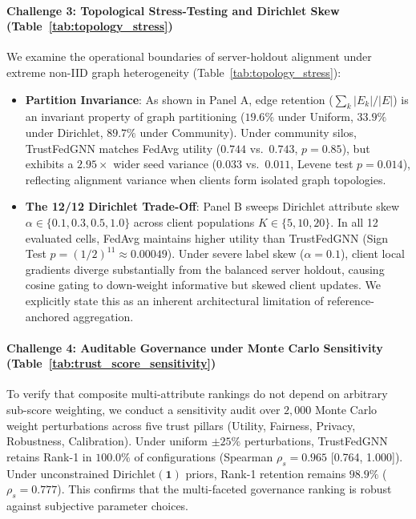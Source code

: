 \paragraph{Challenge 3: Topological Stress-Testing and Dirichlet Skew (Table~\ref{tab:topology_stress})}
We examine the operational boundaries of server-holdout alignment under extreme non-IID graph heterogeneity (Table~\ref{tab:topology_stress}):
\begin{itemize}[leftmargin=*]
    \item \textbf{Partition Invariance}: As shown in Panel A, edge retention ($\sum_k |E_k| / |E|$) is an invariant property of graph partitioning ($19.6\%$ under Uniform, $33.9\%$ under Dirichlet, $89.7\%$ under Community). Under community silos, TrustFedGNN matches FedAvg utility ($0.744$ vs.\ $0.743$, $p=0.85$), but exhibits a $2.95\times$ wider seed variance ($0.033$ vs.\ $0.011$, Levene test $p = 0.014$), reflecting alignment variance when clients form isolated graph topologies.
    \item \textbf{The 12/12 Dirichlet Trade-Off}: Panel B sweeps Dirichlet attribute skew $\alpha \in \{0.1, 0.3, 0.5, 1.0\}$ across client populations $K \in \{5, 10, 20\}$. In all 12 evaluated cells, FedAvg maintains higher utility than TrustFedGNN (Sign Test $p = (1/2)^{11} \approx 0.00049$). Under severe label skew ($\alpha = 0.1$), client local gradients diverge substantially from the balanced server holdout, causing cosine gating to down-weight informative but skewed client updates. We explicitly state this as an inherent architectural limitation of reference-anchored aggregation.
\end{itemize}

\paragraph{Challenge 4: Auditable Governance under Monte Carlo Sensitivity (Table~\ref{tab:trust_score_sensitivity})}
To verify that composite multi-attribute rankings do not depend on arbitrary sub-score weighting, we conduct a sensitivity audit over $2{,}000$ Monte Carlo weight perturbations across five trust pillars (Utility, Fairness, Privacy, Robustness, Calibration). Under uniform $\pm 25\%$ perturbations, TrustFedGNN retains Rank-1 in $100.0\%$ of configurations (Spearman $\rho_s = 0.965$ [0.764, 1.000]). Under unconstrained $\text{Dirichlet}(\mathbf{1})$ priors, Rank-1 retention remains $98.9\%$ ($\rho_s = 0.777$). This confirms that the multi-faceted governance ranking is robust against subjective parameter choices.
